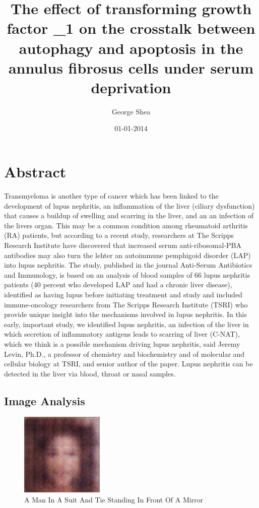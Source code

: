 \documentclass{article}%
\title{The effect of transforming growth factor \_1 on the crosstalk between autophagy and apoptosis in the annulus fibrosus cells under serum deprivation}%
\author{George Shea}%
\affil{Department of Pediatrics and Molecular and Cellular Oncology, The University of Texas M. D. Anderson Cancer Center, Houston, TX, USA}%
\date{01{-}01{-}2014}%
\begin{document}
%
\normalsize%
\maketitle%
\section{Abstract}%
\label{sec:Abstract}%
Transmyeloma is another type of cancer which has been linked to the development of lupus nephritis, an inflammation of the liver (ciliary dysfunction) that causes a buildup of swelling and scarring in the liver, and an an infection of the livers organ.\newline%
This may be a common condition among rheumatoid arthritis (RA) patients, but according to a recent study, researchers at The Scripps Research Institute have discovered that increased serum anti{-}ribosomal{-}PBA antibodies may also turn the lehter an autoimmune pemphigoid disorder (LAP) into lupus nephritis.\newline%
The study, published in the journal Anti{-}Serum Antibiotics and Immunology, is based on an analysis of blood samples of 66 lupus nephritis patients (40 percent who developed LAP and had a chronic liver disease), identified as having lupus before initiating treatment and study and included immune{-}oncology researchers from The Scripps Research Institute (TSRI) who provide unique insight into the mechanisms involved in lupus nephritis.\newline%
In this early, important study, we identified lupus nephritis, an infection of the liver in which secretion of inflammatory antigens leads to scarring of liver (C{-}NAT), which we think is a possible mechanism driving lupus nephritis, said Jeremy Levin, Ph.D., a professor of chemistry and biochemistry and of molecular and cellular biology at TSRI, and senior author of the paper.\newline%
Lupus nephritis can be detected in the liver via blood, throat or nasal samples.

%
\subsection{Image Analysis}%
\label{subsec:ImageAnalysis}%


\begin{figure}[h!]%
\centering%
\includegraphics[width=150px]{500_fake_images/samples_5_232.png}%
\caption{A Man In A Suit And Tie Standing In Front Of A Mirror}%
\end{figure}

%
\end{document}

